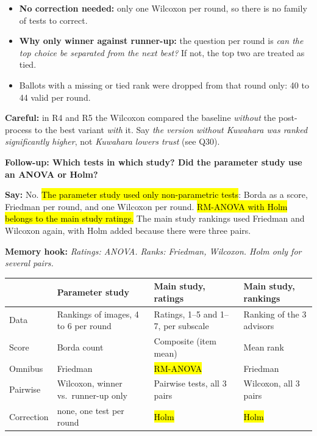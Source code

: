 \documentclass[11pt,a4paper]{article}
\newcommand{\key}[1]{\hl{#1}}
\newcommand{\hook}[1]{{\setlength{\fboxsep}{1.5pt}\colorbox{hlyellow}{\color{black}#1}}}
\newcommand{\say}[1]{\begin{tcolorbox}[colback=knlight,colframe=knblue,boxrule=0.5pt,left=6pt,right=6pt,top=4pt,bottom=4pt]\textbf{Say:} #1\end{tcolorbox}}
\newcommand{\careful}[1]{{\color{knred}\textbf{Careful:} #1}\par}
\begin{document}
\begin{itemize}
  \item \textbf{No correction needed:} only one Wilcoxon per round, so there is no family of tests to correct.
  \item \textbf{Why only winner against runner-up:} the question per round is \emph{can the top choice be separated from the next best?} If not, the top two are treated as tied.
  \item Ballots with a missing or tied rank were dropped from that round only: 40 to 44 valid per round.
\end{itemize}
\careful{in R4 and R5 the Wilcoxon compared the baseline \emph{without} the post-process to the best variant \emph{with} it. Say \emph{the version without Kuwahara was ranked significantly higher}, not \emph{Kuwahara lowers trust} (see Q30).}

{\bfseries\color{knblue}Follow-up: Which tests in which study? Did the parameter study use an ANOVA or Holm?}\par\vspace{0.2em}

\say{No. \key{The parameter study used only non-parametric tests}: Borda as a score, Friedman per round, and one Wilcoxon per round. \key{RM-ANOVA with Holm belongs to the main study ratings.} The main study rankings used Friedman and Wilcoxon again, with Holm added because there were three pairs.}

{\small\color{kngrey}\textbf{Memory hook:} \hook{\emph{Ratings: ANOVA. Ranks: Friedman, Wilcoxon. Holm only for several pairs.}}}

{\small
\renewcommand{\arraystretch}{1.25}
\begin{tabular}{@{}>{\raggedright\arraybackslash}p{}>{\raggedright\arraybackslash}p{}>{\raggedright\arraybackslash}p{}>{\raggedright\arraybackslash}p{}@{}}
\toprule
& \textbf{Parameter study} & \textbf{Main study, ratings} & \textbf{Main study, rankings} \\
\midrule
Data & Rankings of images, 4 to 6 per round & Ratings, 1--5 and 1--7, per subscale & Ranking of the 3 advisors \\
Score & Borda count & Composite (item mean) & Mean rank \\
Omnibus & Friedman & \key{RM-ANOVA} & Friedman \\
Pairwise & Wilcoxon, winner vs.\ runner-up only & Pairwise tests, all 3 pairs & Wilcoxon, all 3 pairs \\
Correction & none, one test per round & \key{Holm} & \key{Holm} \\
\bottomrule
\end{tabular}\par}
\vspace{0.4em}
\end{document}
